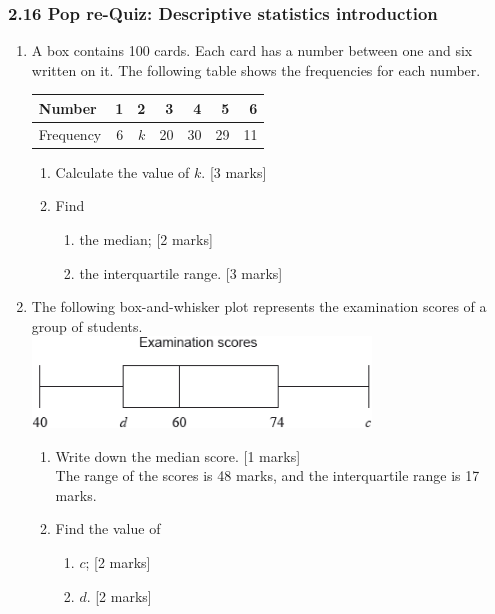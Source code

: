 \documentclass[12pt, twoside]{article}
\begin{document}
\subsubsection*{2.16 Pop re-Quiz: Descriptive statistics introduction}

\begin{enumerate}
 
  \item A box contains 100 cards. Each card has a number between one and six written on it. The following table shows the frequencies for each number.
  
  \begin{tabular}{|l|r|r|r|r|r|r|}
    \hline
    Number & 1 & 2 & 3 & 4 & 5 & 6\\ 
    \hline 
    Frequency & 6 & $k$ & 20 & 30 & 29 & 11\\ 
    \hline 
    \end{tabular}

  \begin{enumerate}
    \item Calculate the value of $k$. \hfill [3 marks] \vspace{2cm}
    \item Find
    \begin{enumerate}
      \item the median; \hfill [2 marks] \vspace{2cm}
      \item the interquartile range. \hfill [3 marks] \vspace{2cm}
    \end{enumerate}
  \end{enumerate}

  \item The following box-and-whisker plot represents the examination scores of a group of students.\\
  \includegraphics[width=9cm]{2-16exam-scores-box-plot.png}
  \begin{enumerate}
    \item Write down the median score. \hfill [1 marks]\\[1.25cm]
    The range of the scores is 48 marks, and the interquartile range is 17 marks.
    \item Find the value of
    \begin{enumerate}
      \item $c$; \hfill [2 marks] \vspace{1.5cm}
      \item $d$. \hfill [2 marks] \vspace{1.5cm}
    \end{enumerate}
  \end{enumerate}


\end{enumerate}
\end{document}
